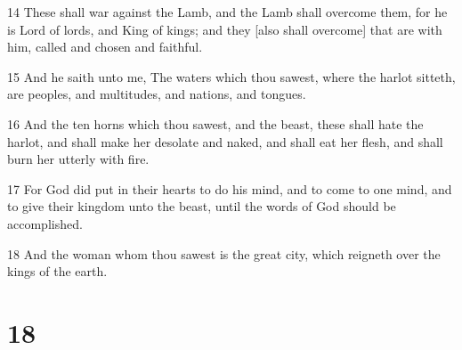 \par 14 These shall war against the Lamb, and the Lamb shall overcome them, for he is Lord of lords, and King of kings; and they [also shall overcome] that are with him, called and chosen and faithful.
\par 15 And he saith unto me, The waters which thou sawest, where the harlot sitteth, are peoples, and multitudes, and nations, and tongues.
\par 16 And the ten horns which thou sawest, and the beast, these shall hate the harlot, and shall make her desolate and naked, and shall eat her flesh, and shall burn her utterly with fire.
\par 17 For God did put in their hearts to do his mind, and to come to one mind, and to give their kingdom unto the beast, until the words of God should be accomplished.
\par 18 And the woman whom thou sawest is the great city, which reigneth over the kings of the earth.

\chapter{18}

